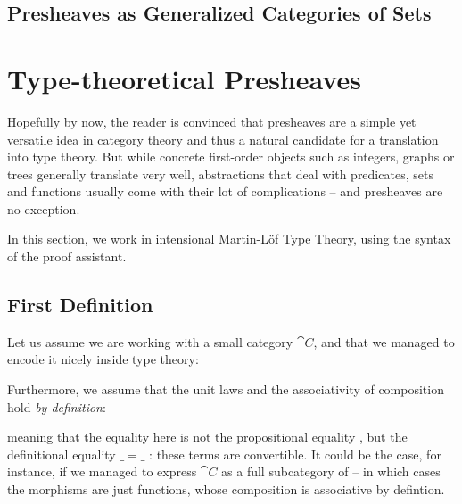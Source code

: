 
\subsection{Presheaves as Generalized Categories of Sets}




\section{Type-theoretical Presheaves}\label{sec:intensional-problems}

Hopefully by now, the reader is convinced that presheaves are a simple yet 
versatile idea in category theory and thus a natural candidate for a 
translation into type theory.
% 
But while concrete first-order objects such as integers, graphs or trees 
generally translate very well, abstractions that deal with predicates, sets
and functions usually come with their lot of complications -- and presheaves
are no exception.

In this section, we work in intensional Martin-Löf Type Theory, using the 
syntax of the \Agda proof assistant.

\subsection{First Definition}

Let us assume we are working with a small category \( \cat{C} \), and that we
managed to encode it nicely inside type theory:


Furthermore, we assume that the unit laws and the associativity of
composition hold \emph{by definition}:


% 
meaning that the equality here is not the propositional equality ,
but the definitional equality \( \_=\_\) : these terms are convertible. 
% 
It could be the case, for instance, if we managed to express \( \cat{C} \) as a 
full subcategory of  -- in which cases the morphisms are just 
functions, whose composition is associative by defintion.

